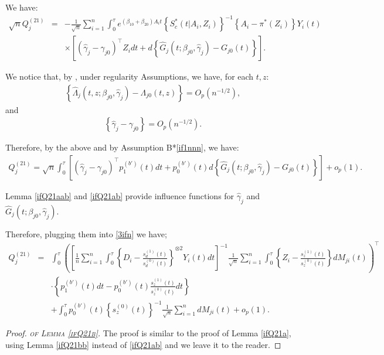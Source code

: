 \documentclass[11pt]{article}
\newcommand{\ee}{\end{eqnarray}}
\newcommand{\eqnn}{\begin{eqnarray*}}
\newcommand{\een}{\end{eqnarray*}}
\newcommand{\be}{\begin{eqnarray}}
\begin{document}
\begin{newproof9}
We have:
\eqnn
\sqrt{n}Q^{(21)}_j&=&-\frac{1}{\sqrt{n}}\sum_{i=1}^n\int_0^\tau e^{ (\beta_{10}  + \beta_{20}) A_i t} \left\{S^{*}_c(t | A_i,Z_i)\right\}^{-1}\left\{A_i -\pi^{*}( Z_i)\right\}Y_i(t)\\&&\times \left[(\hat\gamma_j-\gamma_{j0})^\top Z_idt+d\left\{\hat G_j(t ; \beta_{j0},\hat \gamma_j)-G_{j0}(t)\right\}\right].
\een

We notice that, by \cite{ly}, under regularity Assumptions, we have, for each $t,z$:
\be\label{basn}
\left\{\hat \Lambda_j(t,z; \beta_{j0}, \hat\gamma_j)-\Lambda_{j0}(t,z)\right\}=O_p(n^{-1/2}),
\ee
and
\be\label{gamman}
\left\{\hat \gamma_{j}-\gamma_{j0}\right\}=O_p(n^{-1/2}).
\ee

Therefore, by the above and by Assumption B*\ref{if1nnn}, we have:
\be\label{3ifn}
Q^{(21)}_j=\sqrt{n}\int_0^\tau \left[(\hat\gamma_j-\gamma_{j0})^\top p^{(b')}_{1}(t)dt +p^{(b')}_{0}(t)d\left\{\hat G_j(t ; \beta_{j0},\hat \gamma_j)-G_{j0}(t)\right\}\right]+o_p(1).
\ee

Lemma \ref{ifQ21aab} and \ref{ifQ21ab} provide influence functions for $\hat \gamma_j$ and $\hat G_j(t ; \beta_{j0},\hat \gamma_j)$.

Therefore, plugging them into \eqref{3ifn} we have;
\eqnn\label{ifQn}
Q^{(21)}_j&=&\int_0^\tau \left(\left[\frac{1}{n}\sum_{i=1}^n\int_0^{\tau}\left\{D_i-\frac{s_d^{(1)}(t)}{s_d^{(0)}(t)}\right\}^{\otimes 2}Y_i(t)dt\right]^{-1}\frac{1}{\sqrt{n}}\sum_{i=1}^n
\int_0^\tau \left\{Z_i-\frac{s_z^{(1)}(t)}{s_z^{(0)}(t)}\right\}dM_{ji}(t)\right)^\top 
\\
&&
\cdot
\left\{p^{(b')}_{1}(t)dt -p^{(b')}_{0}(t)\frac{s_z^{(1)}(t)}{s_z^{(0)}(t)}dt\right\}
\\
&&+\int_0^\tau p^{(b')}_{0}(t)\left\{s_z^{(0)}(t)\right\}^{-1}\frac{1}{\sqrt{n}}\sum_{i=1}^ndM_{ji}(t)+o_p(1).
\een
\end{newproof9}


\newenvironment{newproof20}{\begin{proof}\textsc{\emph{of Lemma \ref{ifQ21b}.}}}{\end{proof}}

\begin{newproof20}
The proof is similar to the proof of Lemma \ref{ifQ21a}, using Lemma \ref{ifQ21bb} instead of \ref{ifQ21ab} and we leave it to the reader.
\end{newproof20}
\end{document}
